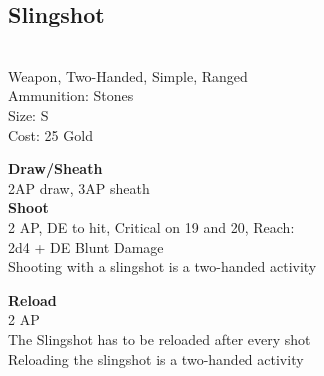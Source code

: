 \subsection{Slingshot}\label{weapon:slingshot}\\
Weapon, Two-Handed, Simple, Ranged\\
Ammunition: Stones\\
Size: S\\
Cost: 25 Gold

\textbf{Draw/Sheath}\\
2AP draw, 3AP sheath\\

\textbf{Shoot}\\
2 AP, DE to hit, Critical on 19 and 20,  Reach:\\
2d4 + \texttimes DE Blunt Damage\\
Shooting with a slingshot is a two-handed activity

\textbf{Reload}\\
2 AP\\
The Slingshot has to be reloaded after every shot\\
Reloading the slingshot is a two-handed activity
